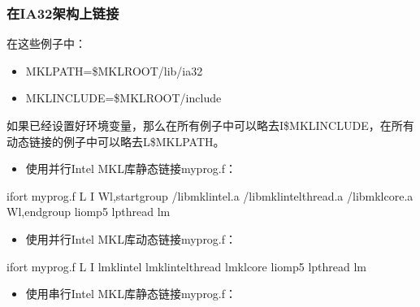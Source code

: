 \documentclass[a4paper,12pt,english]{sphinxmanual}
\begin{document}
\subsubsection{在IA\sphinxhyphen{}32架构上链接}
\label{\detokenize{intel-mkl/intel-mkl:ia-32}}
\sphinxAtStartPar
在这些例子中：
\begin{itemize}
\item {} 
\sphinxAtStartPar
MKLPATH=\$MKLROOT/lib/ia32

\item {} 
\sphinxAtStartPar
MKLINCLUDE=\$MKLROOT/include

\end{itemize}

\sphinxAtStartPar
如果已经设置好环境变量，那么在所有例子中可以略去\sphinxhyphen{}I\$MKLINCLUDE，在所有动态链接的例子中可以略去\sphinxhyphen{}L\$MKLPATH。
\begin{itemize}
\item {} 
\sphinxAtStartPar
使用并行Intel MKL库静态链接myprog.f：

\end{itemize}

\begin{sphinxVerbatim}[commandchars=\\\{\}]
ifort myprog.f \PYGZhy{}L \PYGZhy{}I 
\PYGZhy{}Wl,\PYGZhy{}\PYGZhy{}start\PYGZhy{}group /libmkl\PYGZus{}intel.a /libmkl\PYGZus{}intel\PYGZus{}thread.a 
/libmkl\PYGZus{}core.a \PYGZhy{}Wl,\PYGZhy{}\PYGZhy{}end\PYGZhy{}group \PYGZhy{}liomp5 \PYGZhy{}lpthread \PYGZhy{}lm
\end{sphinxVerbatim}
\begin{itemize}
\item {} 
\sphinxAtStartPar
使用并行Intel MKL库动态链接myprog.f：

\end{itemize}

\begin{sphinxVerbatim}[commandchars=\\\{\}]
ifort myprog.f \PYGZhy{}L \PYGZhy{}I 
\PYGZhy{}lmkl\PYGZus{}intel \PYGZhy{}lmkl\PYGZus{}intel\PYGZus{}thread \PYGZhy{}lmkl\PYGZus{}core \PYGZhy{}liomp5 \PYGZhy{}lpthread \PYGZhy{}lm
\end{sphinxVerbatim}
\begin{itemize}
\item {} 
\sphinxAtStartPar
使用串行Intel MKL库静态链接myprog.f：

\end{itemize}
\end{document}
